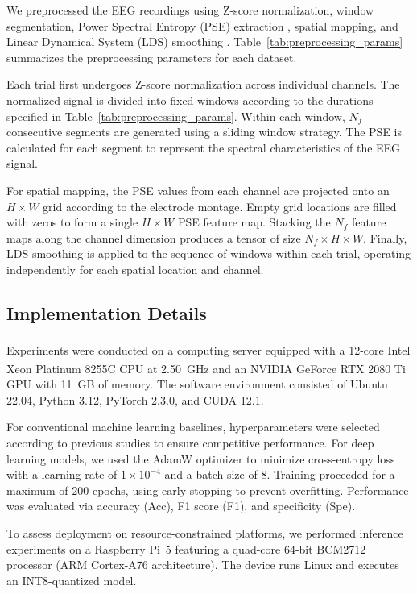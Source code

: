 \documentclass[12pt]{article}
\begin{document}
We preprocessed the EEG recordings using Z-score normalization, window segmentation, Power Spectral Entropy (PSE) extraction \cite{PSE}, spatial mapping, and Linear Dynamical System (LDS) smoothing \cite{ref65}. Table~\ref{tab:preprocessing_params} summarizes the preprocessing parameters for each dataset.

Each trial first undergoes Z-score normalization across individual channels. The normalized signal is divided into fixed windows according to the durations specified in Table~\ref{tab:preprocessing_params}. Within each window, $N_f$ consecutive segments are generated using a sliding window strategy. The PSE is calculated for each segment to represent the spectral characteristics of the EEG signal.  

For spatial mapping, the PSE values from each channel are projected onto an $H \times W$ grid according to the electrode montage. Empty grid locations are filled with zeros to form a single $H \times W$ PSE feature map. Stacking the $N_f$ feature maps along the channel dimension produces a tensor of size $N_f \times H \times W$. Finally, LDS smoothing is applied to the sequence of windows within each trial, operating independently for each spatial location and channel.


\subsection{Implementation Details}

Experiments were conducted on a computing server equipped with a 12-core Intel\textsuperscript{\textregistered} Xeon\textsuperscript{\textregistered} Platinum 8255C CPU at 2.50~GHz and an NVIDIA GeForce RTX 2080 Ti GPU with 11~GB of memory. The software environment consisted of Ubuntu 22.04, Python 3.12, PyTorch 2.3.0, and CUDA 12.1.

For conventional machine learning baselines, hyperparameters were selected according to previous studies to ensure competitive performance. For deep learning models, we used the AdamW optimizer \cite{ref64} to minimize cross-entropy loss with a learning rate of $1\times10^{-4}$ and a batch size of $8$. Training proceeded for a maximum of $200$ epochs, using early stopping to prevent overfitting. Performance was evaluated via accuracy (Acc), F1 score (F1), and specificity (Spe).

To assess deployment on resource-constrained platforms, we performed inference experiments on a Raspberry Pi~5 featuring a quad-core 64-bit BCM2712 processor (ARM Cortex-A76 architecture). The device runs Linux and executes an INT8-quantized model. 
\end{document}

